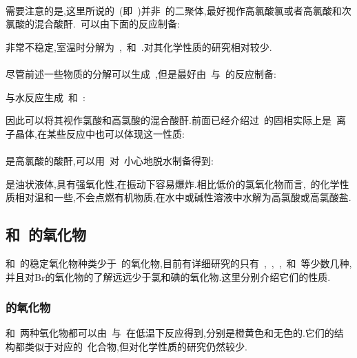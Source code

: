 \documentclass{ctexbook}
\begin{document}
\paragraph{}
需要注意的是,这里所说的~(即~)并非~的二聚体,最好视作高氯酸氯或者高氯酸和次氯酸的混合酸酐.~可以由下面的反应制备:
\begin{tightcenter}
\end{tightcenter}
\indent {}非常不稳定,室温时分解为~,~和~.对其化学性质的研究相对较少.
\paragraph{}
尽管前述一些物质的分解可以生成~,但是最好由~与~的反应制备:
\begin{tightcenter}
\end{tightcenter}
\indent {}与水反应生成~和~:
\begin{tightcenter}
\end{tightcenter}
因此可以将其视作氯酸和高氯酸的混合酸酐.前面已经介绍过~的固相实际上是~\ce{[ClO2]+[ClO4]-}离子晶体,在某些反应中也可以体现这一性质:
\begin{tightcenter}
\end{tightcenter}
\paragraph{}
是高氯酸的酸酐,可以用~对~小心地脱水制备得到:
\begin{tightcenter}
\end{tightcenter}
\indent {}是油状液体,具有强氧化性,在振动下容易爆炸.相比低价的氯氧化物而言,~的化学性质相对温和一些,不会点燃有机物质,在水中或碱性溶液中水解为高氯酸或高氯酸盐.
\subsection{和~的氧化物}
和~的稳定氧化物种类少于~的氧化物,目前有详细研究的只有~,~,~,~和~等少数几种,并且对Br的氧化物的了解远远少于氯和碘的氧化物.这里分别介绍它们的性质.
\subsubsection{的氧化物}
和~两种氧化物都可以由~与~在低温下反应得到,分别是橙黄色和无色的.它们的结构都类似于对应的~化合物,但对化学性质的研究仍然较少.
\end{document}
